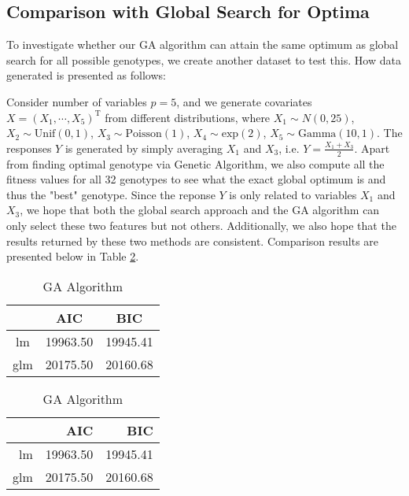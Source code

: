 \documentclass{article}
\def\T{{ \mathrm{\scriptscriptstyle T} }}
\def\T{\mathrm{\scriptstyle T}} %
\begin{document}
\subsection{Comparison with Global Search for Optima}
To investigate whether our GA algorithm can attain the same optimum as global search for all possible genotypes, we create another dataset to test this. How data generated is presented as follows:

\vspace{3mm}
\noindent
Consider number of variables $p=5$, and we generate covariates $X=(X_{1}, \cdots, X_{5})^{\T}$ from different distributions, where $X_{1}\sim N(0,25)$, $X_{2}\sim \mathrm{Unif}(0,1)$, $X_{3}\sim \mathrm{Poisson}(1)$, $X_{4}\sim \mathrm{exp}(2)$, $X_{5}\sim \mathrm{Gamma}(10,1)$. The responses $Y$ is generated by simply averaging $X_{1}$ and $X_{3}$, i.e. $Y=\frac{X_{1}+X_{3}}{2}$. Apart from finding optimal genotype via Genetic Algorithm, we also compute all the fitness values for all 32 genotypes to see what the exact global optimum is and thus the "best" genotype. Since the reponse $Y$ is only related to variables $X_{1}$ and $X_{3}$, we hope that both the global search approach and the GA algorithm can only select these two features but not others. Additionally, we also hope that the results returned by these two methods are consistent. Comparison results are presented below in Table \ref{table:1}.


\begin{table}[htp]
    \centering
    \caption{Comparison of optimal fitness values with respect to global search and GA algorithm}
    \vspace{0.05in}
            \newsavebox{\tableboxb}
\begin{lrbox}{\tableboxb}
    \begin{minipage}{.5\linewidth}
      \caption{Global Search}
      \centering
        \begin{tabular}{c|c|c}
  \hline
 & AIC & BIC \\
  \hline
lm & 19963.50 & 19945.41 \\
  glm & 20175.50 & 20160.68 \\
   \hline
\end{tabular}
    \end{minipage}%
    \begin{minipage}{.5\linewidth}
      \centering
        \caption{GA Algorithm}
        \begin{tabular}{r|r|r}
  \hline
 & AIC & BIC \\
  \hline
lm & 19963.50 & 19945.41 \\
  glm & 20175.50 & 20160.68 \\
   \hline
\end{tabular}
    \end{minipage}
    \end{lrbox}
    \label{table:1}
\scalebox{1}{\usebox{\tableboxb}}
\end{table}
\end{document}
